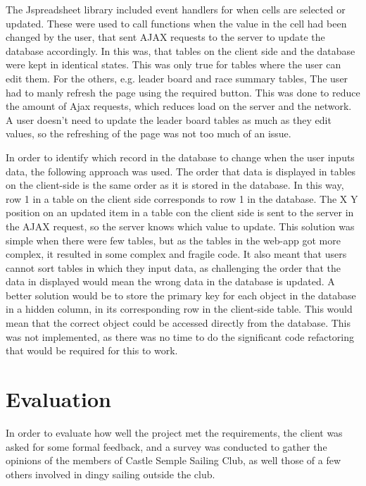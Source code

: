 \documentclass{l4proj}
\begin{document}
The Jspreadsheet library included event handlers for when cells are selected or updated. These were used to call functions when the value in the cell had been changed by the user, that sent AJAX requests to the server to update the database accordingly. In this was, that tables on the client side and the database were kept in identical states. This was only true for tables where the user can edit them. For the others, e.g. leader board and race summary tables, The user had to manly refresh the page using the required button. This was done to reduce the amount of Ajax requests, which reduces load on the server and the network. A user doesn't need to update the leader board tables as much as they edit values, so the refreshing of the page was not too much of an issue.

In order to identify which record in the database to change when the user inputs data, the following approach was used. The order that data is displayed in tables on the client-side is the same order as it is stored in the database. In this way, row 1 in a table on the client side corresponds to row 1 in the database. The X Y position on an updated item in a table con the client side is sent to the server in the AJAX request, so the server knows which value to update. This solution was simple when there were few tables, but as the tables in the web-app got more complex, it resulted in some complex and fragile code. It also meant that users cannot sort tables in which they input data, as challenging the order that the data in displayed would mean the wrong data in the database is updated. A better solution would be to store the primary key for each object in the database in a hidden column, in its corresponding row in the client-side table. This would mean that the correct object could be accessed directly from the database. This was not implemented, as there was no time to do the significant code refactoring that would be required for this to work.


\chapter{Evaluation}\label{chap:eval}
In order to evaluate how well the project met the requirements, the client was asked for some formal feedback, and a survey was conducted to gather the opinions of the members of Castle Semple Sailing Club, as well those of a few others involved in dingy sailing outside the club.
\end{document}
